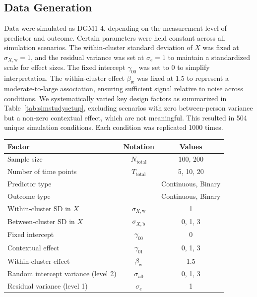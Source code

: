 \subsection{Data Generation}

Data were simulated as DGM1-4, depending on the measurement level of predictor and outcome. Certain parameters were held constant across all simulation scenarios. The within-cluster standard deviation of $X$ was fixed at $\sigma_{X,\text{w}} = 1$, and the residual variance was set at $\sigma_e = 1$ to maintain a standardized scale for effect sizes. The fixed intercept $\gamma_{00}$ was set to 0 to simplify interpretation. The within-cluster effect $\beta_{\text{w}}$ was fixed at 1.5 to represent a moderate-to-large association, ensuring sufficient signal relative to noise across conditions. We systematically varied key design factors as summarized in Table~\ref{tab:simstudysetup}, excluding scenarios with zero between-person variance but a non-zero contextual effect, which are not meaningful. This resulted in 504 unique simulation conditions. Each condition was replicated 1000 times.

\begin{center}
    \label{tab:simstudysetup}
    
    \begin{longtable}{lcc}
    \toprule
    Factor & Notation & Values \\
    \midrule
    Sample size  & \(N_{\text{total}}\) & 100, 200 \\
    Number of time points  & \(T_{\text{total}}\) & 5, 10, 20 \\
    Predictor type  &  & Continuous, Binary\\
    Outcome type  &  & Continuous, Binary\\
    Within-cluster SD in $X$  & \(\sigma_{X,\text{w}}\) & 1 \\
    Between-cluster SD in $X$  & \(\sigma_{X,\text{b}}\) & 0, 1, 3 \\
    Fixed intercept  & \(\gamma_{00}\) & 0 \\
    Contextual effect  & \(\gamma_{01}\) & 0, 1, 3 \\
    Within-cluster effect  & \(\beta_{\text{w}}\) & 1.5 \\
    Random intercept variance (level 2) & \(\sigma_{u0}\) & 0, 1, 3 \\
    Residual variance (level 1)  & \(\sigma_e\) & 1 \\
    \bottomrule
    \end{longtable}
\end{center}


